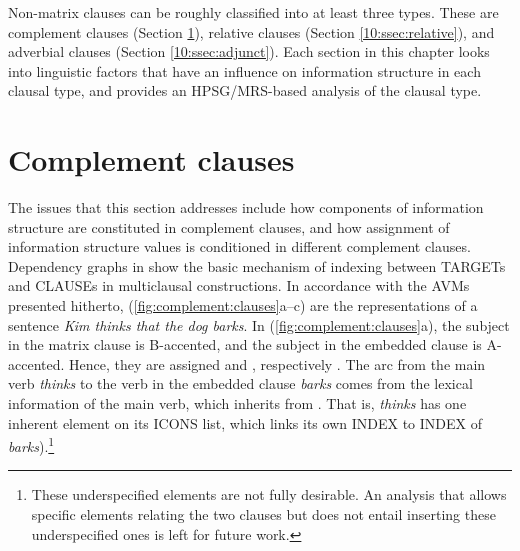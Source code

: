 Non-matrix clauses can be roughly classified into at least three
types.  These are complement clauses
(Section \ref{10:ssec:embedded}), relative clauses
(Section \ref{10:ssec:relative}), and adverbial clauses
(Section \ref{10:ssec:adjunct}). Each section in this
chapter looks into linguistic factors that have an influence on
information structure in each clausal type, and
provides an HPSG/MRS-based analysis of the clausal type.




\section{Complement clauses}
\label{10:ssec:embedded}


The issues that this section addresses include how components of
information structure are constituted in complement
clauses, and how assignment of information
structure values is conditioned in different complement clauses.
Dependency graphs in  show the basic
mechanism of indexing between TARGETs and CLAUSEs in multiclausal
constructions. In accordance with the AVMs
presented hitherto, (\ref{fig:complement:clauses}a--c) are the
representations of a sentence \textit{Kim thinks that the dog
  barks}. In (\ref{fig:complement:clauses}a), the subject in the
matrix clause is B-accented, and the subject in the embedded clause is
A-accented. Hence, they are assigned
 and ,
respectively . The arc from the main verb
\textit{thinks} to the verb in the embedded clause \textit{barks}
comes from the lexical information of the main verb, which inherits
from . That is, \textit{thinks} has one
inherent element on its ICONS list, which links its own INDEX to INDEX
of \textit{barks}).\footnote{These underspecified 
  elements are not fully desirable. An analysis
  that allows specific  elements relating the two clauses
  but does not entail inserting these underspecified ones is left for
  future work.}





